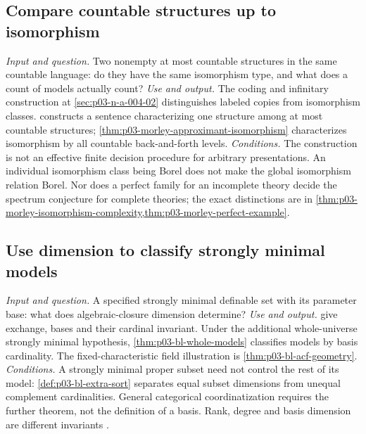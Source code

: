 \subsection{Compare countable structures up to isomorphism}
\label{sec:p14-finder-countable-isomorphism}
\textit{Input and question.} Two nonempty at most countable structures in
the same countable language: do they have the same isomorphism type, and
what does a count of models actually count?
\textit{Use and output.} The coding and infinitary construction at
\cref{sec:p03-n-a-004-02} distinguishes labeled copies from isomorphism
classes.  constructs a sentence
characterizing one structure among at most countable structures;
\cref{thm:p03-morley-approximant-isomorphism} characterizes isomorphism
by all countable back-and-forth levels.
\textit{Conditions.} The construction is not an effective finite decision
procedure for arbitrary presentations. An individual isomorphism class
being Borel does not make the global isomorphism relation Borel. Nor does
a perfect family for an incomplete theory decide the spectrum conjecture
for complete theories; the exact distinctions are in
\cref{thm:p03-morley-isomorphism-complexity,thm:p03-morley-perfect-example}.

\subsection{Use dimension to classify strongly minimal models}
\label{sec:p14-finder-strongly-minimal-dimension}
\textit{Input and question.} A specified strongly minimal definable set
with its parameter base: what does algebraic-closure dimension determine?
\textit{Use and output.} 
give exchange, bases and their cardinal invariant. Under the additional
whole-universe strongly minimal hypothesis,
\cref{thm:p03-bl-whole-models} classifies models by basis cardinality.
The fixed-characteristic field illustration is
\cref{thm:p03-bl-acf-geometry}.
\textit{Conditions.} A strongly minimal proper subset need not control
the rest of its model: \cref{def:p03-bl-extra-sort} separates equal subset
dimensions from unequal complement cardinalities. General categorical
coordinatization requires the further theorem, not the definition of a
basis. Rank, degree and basis dimension are different invariants
\cite{Morley1965,BaldwinLachlan1971}.

